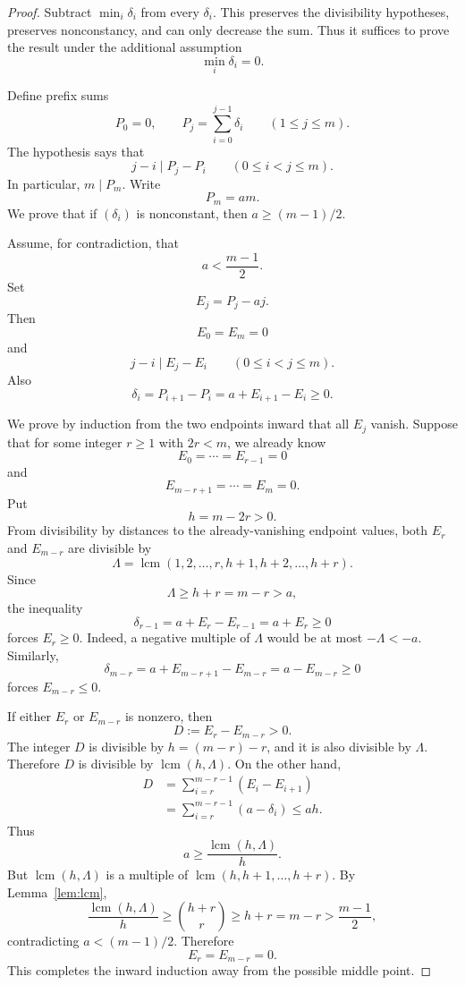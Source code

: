 \documentclass[10pt,a4paper]{amsart}
\newcommand{\lcm}{\operatorname{lcm}}
\numberwithin{equation}{section}
\begin{document}
\begin{proof}
Subtract $\min_i\delta_i$ from every $\delta_i$.
This preserves the divisibility hypotheses, preserves nonconstancy, and can only decrease the sum.
Thus it suffices to prove the result under the additional assumption
\[
        \min_i\delta_i=0.
\]

Define prefix sums
\[
        P_0=0,
        \qquad
        P_j=\sum_{i=0}^{j-1}\delta_i
        \qquad (1\le j\le m).
\]
The hypothesis says that
\[
        j-i\mid P_j-P_i
        \qquad
        (0\le i<j\le m).
\]
In particular, $m\mid P_m$.
Write
\[
        P_m=am.
\]
We prove that if $(\delta_i)$ is nonconstant, then $a\ge (m-1)/2$.

Assume, for contradiction, that
\[
        a<\frac{m-1}{2}.
\]
Set
\[
        E_j=P_j-aj.
\]
Then
\[
        E_0=E_m=0
\]
and
\[
        j-i\mid E_j-E_i
        \qquad
        (0\le i<j\le m).
\]
Also
\[
        \delta_i=P_{i+1}-P_i=a+E_{i+1}-E_i\ge0.
\]

We prove by induction from the two endpoints inward that all $E_j$ vanish.
Suppose that for some integer $r\ge1$ with $2r<m$, we already know
\[
        E_0=\cdots=E_{r-1}=0
\]
and
\[
        E_{m-r+1}=\cdots=E_m=0.
\]
Put
\[
        h=m-2r>0.
\]
From divisibility by distances to the already-vanishing endpoint values, both $E_r$ and $E_{m-r}$ are divisible by
\[
        \Lambda=
        \lcm(1,2,\ldots,r,h+1,h+2,\ldots,h+r).
\]
Since
\[
        \Lambda\ge h+r=m-r>a,
\]
the inequality
\[
        \delta_{r-1}=a+E_r-E_{r-1}=a+E_r\ge0
\]
forces $E_r\ge0$.
Indeed, a negative multiple of $\Lambda$ would be at most $-\Lambda<-a$.
Similarly,
\[
        \delta_{m-r}=a+E_{m-r+1}-E_{m-r}=a-E_{m-r}\ge0
\]
forces $E_{m-r}\le0$.

If either $E_r$ or $E_{m-r}$ is nonzero, then
\[
        D:=E_r-E_{m-r}>0.
\]
The integer $D$ is divisible by $h=(m-r)-r$, and it is also divisible by $\Lambda$.
Therefore $D$ is divisible by $\lcm(h,\Lambda)$.
On the other hand,
\[
\begin{aligned}
        D
        &=
        \sum_{i=r}^{m-r-1}(E_i-E_{i+1}) \\
        &=
        \sum_{i=r}^{m-r-1}(a-\delta_i)
        \le ah.
\end{aligned}
\]
Thus
\[
        a\ge \frac{\lcm(h,\Lambda)}{h}.
\]
But $\lcm(h,\Lambda)$ is a multiple of $\lcm(h,h+1,\ldots,h+r)$.
By Lemma~\ref{lem:lcm},
\[
        \frac{\lcm(h,\Lambda)}{h}
        \ge
        \binom{h+r}{r}
        \ge
        h+r
        =m-r
        >\frac{m-1}{2},
\]
contradicting $a<(m-1)/2$.
Therefore
\[
        E_r=E_{m-r}=0.
\]
This completes the inward induction away from the possible middle point.


\end{proof}
\end{document}
